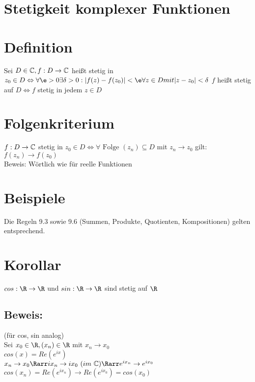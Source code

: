 %
\section*{Stetigkeit komplexer Funktionen}
\section{Definition}
Sei $D\in \text{$\mathbb{C}$}, f: D\to \text{$\mathbb{C}$}$ heißt stetig in $z_0 \in D\Leftrightarrow \forall\e>0\exists \delta > 0: |f(z) - f(z_0)|< \e \forall z \in D mit |z-z_0|<\delta$
$f$ heißt stetig auf $D \Leftrightarrow f$ stetig in jedem $z \in D$
\section{Folgenkriterium}
$f:D\to \text{$\mathbb{C}$}$ stetig in $z_0 \in D \Leftrightarrow \forall \text{ Folge } (z_n) \subseteq D$ mit $z_n \to z_0$ gilt: $f(z_n) \to f(z_0)$\\
Beweis: Wörtlich wie für reelle Funktionen\\
\section{Beispiele}
Die Regeln 9.3 sowie 9.6 (Summen, Produkte, Quotienten, Kompositionen) gelten entsprechend.
\section{Korollar}
$cos:\R \to \R$ und $sin:\R \to \R$ sind stetig auf $\R$
\subsection*{Beweis:}
(für cos, sin analog)\\
Sei $x_0 \in \R, (x_n) \in \R$ mit $x_n \to x_0$\\
$cos(x) = Re(e^{ix})$\\
$x_n \to x_0 \Rarr ix_n \to ix_0~(im~\C) \Rarr e^{ix_n} \to e^{ix_0}$\\
$cos(x_n) = Re(e^{ix_n}) \to Re(e^{ix_0}) = cos(x_0)$

